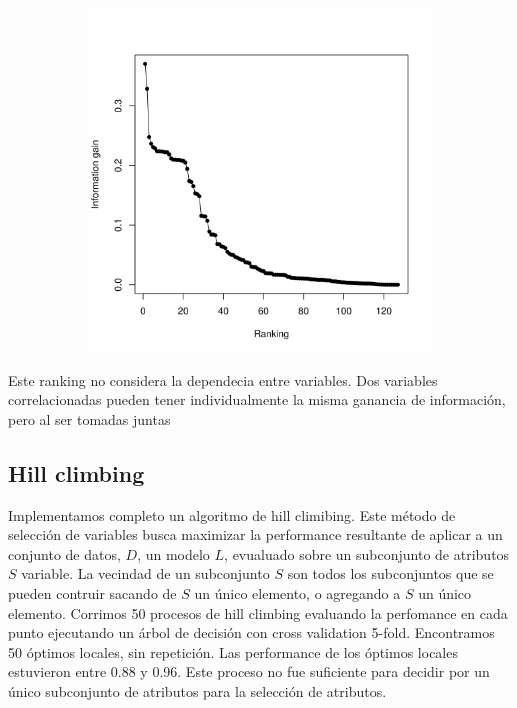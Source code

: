 \documentclass[a4paper,10pt]{article}
\begin{document}
  \begin{figure}[H]
    \centering
    \begin{subfigure}[b]{0.4\textwidth}
      \includegraphics[width=\textwidth]{../imagenes/features_ranking}
     
    \end{subfigure}
      \caption{}
    \label{fig:features_ranking}
  \end{figure}

Este ranking no considera la dependecia entre variables. Dos variables correlacionadas pueden tener individualmente la misma ganancia de informaci\'on, pero al ser tomadas juntas

\subsection{Hill climbing}

Implementamos completo un algoritmo de hill climibing. Este m\'etodo de selecci\'on de variables busca maximizar la performance resultante de aplicar a un conjunto de datos, $D$, un modelo $L$, evualuado sobre un subconjunto de atributos $S$ variable. La vecindad de un subconjunto $S$ son todos los subconjuntos que se pueden contruir sacando de $S$ un \'unico elemento, o agregando a $S$ un \'unico elemento. Corrimos 50 procesos de hill climbing evaluando la perfomance en cada punto ejecutando un \'arbol de decisi\'on con cross validation 5-fold. Encontramos 50 \'optimos locales, sin repetici\'on. Las performance de los \'optimos locales estuvieron entre 0.88 y 0.96. Este proceso no fue suficiente para decidir por un \'unico subconjunto de atributos para la selecci\'on de atributos. 
\end{document}
